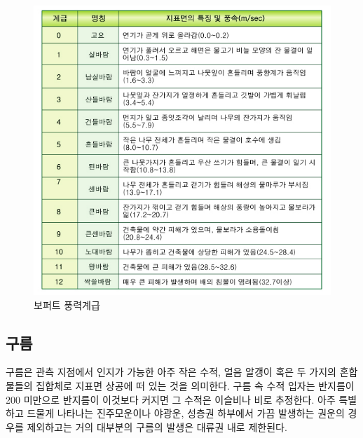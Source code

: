 \begin{itemize}
{\begin{figure}[h!]
	\centering
	\includegraphics[width=0.9\linewidth]{21observing/images/11120_1_2}
	\caption{보퍼트 풍력계급}
	\label{fig:1112012}
\end{figure}


\subsection{구름}

구름은 관측 지점에서 인지가 가능한 아주 작은 수적, 얼음 알갱이 혹은 두 가지의 혼합물들의 집합체로 지표면 상공에 떠 있는 것을 의미한다. 구름 속 수적 입자는 반지름이 200 미만으로 반지름이 이것보다 커지면 그 수적은 이슬비나 비로 추정한다. 아주 특별하고 드물게 나타나는 진주모운이나 야광운, 성층권 하부에서 가끔 발생하는 권운의 경우를 제외하고는 거의
대부분의 구름의 발생은 대류권 내로 제한된다. 

}
\end{itemize}
